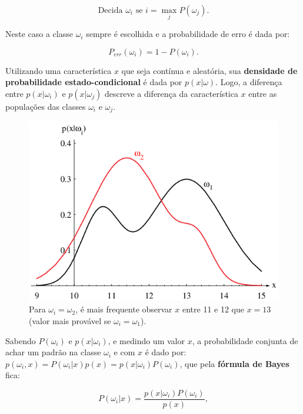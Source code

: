 \documentclass[a4paper,12pt,twocolumn]{article}
\begin{document}
\begin{equation}
    \text{Decida } \omega_i \text{ se } i = \max_j P(\omega_j).
    \label{eq:decision_1}
\end{equation}

\noindent Neste caso a classe $\omega_i$ sempre é escolhida e a probabilidade de erro é dada por:

\begin{equation}
    P_{err}(\omega_i) = 1 - P(\omega_i).
    \label{eq:prob_i_error}
\end{equation}

Utilizando uma característica $x$ que seja contínua e aleatória, sua \textbf{densidade de probabilidade estado-condicional} é dada por $p(x|\omega)$. Logo, a diferença entre $p(x|\omega_i)$ e $p(x|\omega_j)$ descreve a diferença da característica $x$ entre as populações das classes $\omega_i$ e $\omega_j$.

\begin{figure}[ht]
    \centering
    \includegraphics[scale=0.4]{state-conditional_pdf}
    \caption{Para $\omega_i = \omega_2$, é mais frequente observar $x$ entre 11 e 12 que $x = 13$ (valor mais provável se $\omega_i = \omega_1$).}
    \label{fig:state-conditional_pdf}
\end{figure}

Sabendo $P(\omega_i)$ e $p(x|\omega_i)$, e medindo um valor $x$, a probabilidade conjunta de achar um padrão na classe $\omega_i$ e com $x$ é dado por: $p(\omega_i,x) = P(\omega_i|x)p(x) = p(x|\omega_i)P(\omega_i)$, que pela \textbf{fórmula de Bayes} fica:

\begin{equation}
    P(\omega_i|x) = \frac{p(x|\omega_i)P(\omega_i)}{p(x)},
    \label{eq:bayes}
\end{equation}
\end{document}
